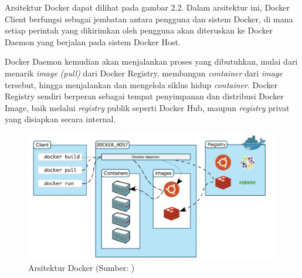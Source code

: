 Arsitektur Docker dapat dilihat pada gambar 2.2. Dalam arsitektur ini, Docker Client berfungsi sebagai jembatan antara pengguna dan sistem Docker, di mana setiap perintah yang dikirimkan oleh pengguna akan diteruskan ke Docker Daemon yang berjalan pada sistem Docker Host.

Docker Daemon kemudian akan menjalankan proses yang dibutuhkan, mulai dari menarik \textit{image} \textit{(pull)} dari Docker Registry, membangun \textit{container} dari \textit{image} tersebut, hingga menjalankan dan mengelola siklus hidup \textit{container}. Docker Registry sendiri berperan sebagai tempat penyimpanan dan distribusi Docker Image, baik melalui \textit{registry} publik seperti Docker Hub, maupun \textit{registry }privat yang disiapkan secara internal.

\begin{figure} [H] \centering
  \includegraphics[scale=0.40]{gambar/docker-arch.png}
  \caption{Arsitektur Docker (Sumber: \cite{sysdigteam2024docker})}
  \label{fig:Arsitektur Docker}
\end{figure}




